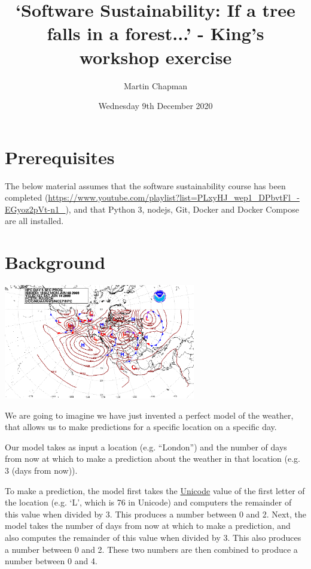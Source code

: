 \documentclass{article}
\title{`Software Sustainability: If a tree falls in a forest...' -
King's workshop exercise}
\author{Martin Chapman}
\date{Wednesday 9th December 2020}
\begin{document}

\maketitle

\section{Prerequisites}

The below material assumes that the software sustainability course has been completed (\href{https://www.youtube.com/playlist?list=PLxyHJ\_wep1\_DPbvtFl\_-EGyoz2pVt-n1\_}{https://www.youtube.com/playlist?list=PLxyHJ\_wep1\_DPbvtFl\_-EGyoz2pVt-n1\_}), and that Python 3, nodejs, Git, Docker and Docker Compose are all installed. 

\section{Background}

\begin{center}
    \includegraphics[height=5cm]{weather.png}
\end{center}

We are going to imagine we have just invented a perfect model of
the weather, that allows us to make predictions for a specific
location on a specific day.

Our model takes as input a location (e.g. ``London'') and the
number of days from now at which to make a prediction about
the weather in that location (e.g. 3 (days from now)).

To make a prediction, the model first takes the \href{https://en.wikipedia.org/wiki/List_of_Unicode_characters}{Unicode} value of
the first letter of the location (e.g. `L', which is 76 in
Unicode) and computers the remainder of this value when divided
by 3. This produces a number between 0 and 2. Next, the model
takes the number of days from now at which to make a prediction,
and also computes the remainder of this value when divided by 3.
This also produces a number between 0 and 2. These two numbers
are then combined to produce a number between 0 and 4.
\end{document}
